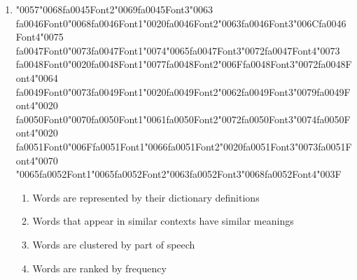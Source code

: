 \documentclass[12pt]{article}
\begin{document}
\begin{enumerate}[label=Q\arabic*.]
\begin{enumerate}[label=(\Alph*)]
    \item GD converges faster because updates are noisier
    \item SGD cannot be used with neural networks
\end{enumerate}
\item {\char"0057}{\char"0068}{\csname fa0045Font2\endcsname\char"0069}{\csname fa0045Font3\endcsname\char"0063} {\csname fa0046Font0\endcsname\char"0068}{\csname fa0046Font1\endcsname\char"0020}{\csname fa0046Font2\endcsname\char"0063}{\csname fa0046Font3\endcsname\char"006C}{\csname fa0046Font4\endcsname\char"0075} {\csname fa0047Font0\endcsname\char"0073}{\csname fa0047Font1\endcsname\char"0074}{\char"0065}{\csname fa0047Font3\endcsname\char"0072}{\csname fa0047Font4\endcsname\char"0073} {\csname fa0048Font0\endcsname\char"0020}{\csname fa0048Font1\endcsname\char"0077}{\csname fa0048Font2\endcsname\char"006F}{\csname fa0048Font3\endcsname\char"0072}{\csname fa0048Font4\endcsname\char"0064} {\csname fa0049Font0\endcsname\char"0073}{\csname fa0049Font1\endcsname\char"0020}{\csname fa0049Font2\endcsname\char"0062}{\csname fa0049Font3\endcsname\char"0079}{\csname fa0049Font4\endcsname\char"0020} {\csname fa0050Font0\endcsname\char"0070}{\csname fa0050Font1\endcsname\char"0061}{\csname fa0050Font2\endcsname\char"0072}{\csname fa0050Font3\endcsname\char"0074}{\csname fa0050Font4\endcsname\char"0020} {\csname fa0051Font0\endcsname\char"006F}{\csname fa0051Font1\endcsname\char"0066}{\csname fa0051Font2\endcsname\char"0020}{\csname fa0051Font3\endcsname\char"0073}{\csname fa0051Font4\endcsname\char"0070} {\char"0065}{\csname fa0052Font1\endcsname\char"0065}{\csname fa0052Font2\endcsname\char"0063}{\csname fa0052Font3\endcsname\char"0068}{\csname fa0052Font4\endcsname\char"003F}
\begin{enumerate}[label=(\Alph*)]
    \item Words are represented by their dictionary definitions
    \item Words that appear in similar contexts have similar meanings
    \item Words are clustered by part of speech
    \item Words are ranked by frequency
\end{enumerate}

\end{enumerate}
\end{document}
